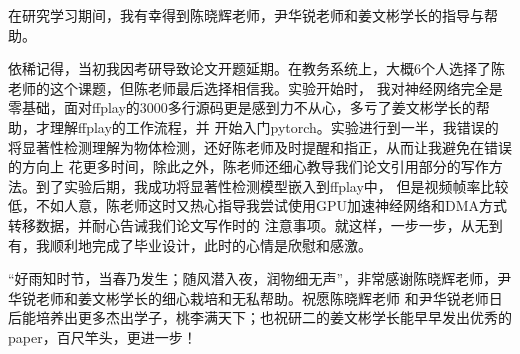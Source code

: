 
\begin{acknowledgements}

在研究学习期间，我有幸得到陈晓辉老师，尹华锐老师和姜文彬学长的指导与帮助。

依稀记得，当初我因考研导致论文开题延期。在教务系统上，大概6个人选择了陈老师的这个课题，但陈老师最后选择相信我。实验开始时，
我对神经网络完全是零基础，面对ffplay的3000多行源码更是感到力不从心，多亏了姜文彬学长的帮助，才理解ffplay的工作流程，并
开始入门pytorch。实验进行到一半，我错误的将显著性检测理解为物体检测，还好陈老师及时提醒和指正，从而让我避免在错误的方向上
花更多时间，除此之外，陈老师还细心教导我们论文引用部分的写作方法。到了实验后期，我成功将显著性检测模型嵌入到ffplay中，
但是视频帧率比较低，不如人意，陈老师这时又热心指导我尝试使用GPU加速神经网络和DMA方式转移数据，并耐心告诫我们论文写作时的
注意事项。就这样，一步一步，从无到有，我顺利地完成了毕业设计，此时的心情是欣慰和感激。

“好雨知时节，当春乃发生；随风潜入夜，润物细无声”，非常感谢陈晓辉老师，尹华锐老师和姜文彬学长的细心栽培和无私帮助。祝愿陈晓辉老师
和尹华锐老师日后能培养出更多杰出学子，桃李满天下；也祝研二的姜文彬学长能早早发出优秀的paper，百尺竿头，更进一步！

\end{acknowledgements}
